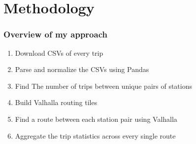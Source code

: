 \documentclass{beamer}
\begin{document}
\section{Methodology}
\begin{frame}
    \frametitle{Overview of my approach}
    \begin{enumerate}
        \item Download CSVs of every trip
        \item Parse and normalize the CSVs using Pandas
        \item Find The number of trips between unique pairs of stations
        \item Build Valhalla routing tiles
        \item Find a route between each station pair using Valhalla
        \item Aggregate the trip statistics across every single route
    \end{enumerate}
\end{frame}
\end{document}
